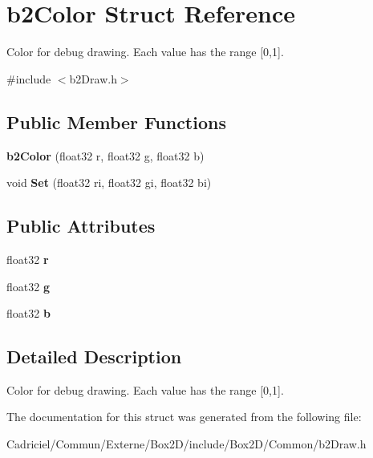 \hypertarget{structb2_color}{}\section{b2\+Color Struct Reference}
\label{structb2_color}


Color for debug drawing. Each value has the range \mbox{[}0,1\mbox{]}.  




{\ttfamily \#include $<$b2\+Draw.\+h$>$}

\subsection*{Public Member Functions}
\begin{DoxyCompactItemize}
\item 
{\bfseries b2\+Color} (float32 r, float32 g, float32 b)\hypertarget{structb2_color_abddfc60d402d691542a224921868bfb7}{}\label{structb2_color_abddfc60d402d691542a224921868bfb7}

\item 
void {\bfseries Set} (float32 ri, float32 gi, float32 bi)\hypertarget{structb2_color_af35a718911e10a54fa8aaa86367a5b56}{}\label{structb2_color_af35a718911e10a54fa8aaa86367a5b56}

\end{DoxyCompactItemize}
\subsection*{Public Attributes}
\begin{DoxyCompactItemize}
\item 
float32 {\bfseries r}\hypertarget{structb2_color_a9ab6c9a910caee177d96980b74ffb00b}{}\label{structb2_color_a9ab6c9a910caee177d96980b74ffb00b}

\item 
float32 {\bfseries g}\hypertarget{structb2_color_a241c742352403ec456b51ac5f2abe7d9}{}\label{structb2_color_a241c742352403ec456b51ac5f2abe7d9}

\item 
float32 {\bfseries b}\hypertarget{structb2_color_a9e7380d27a63010cfad49b97f66dcd26}{}\label{structb2_color_a9e7380d27a63010cfad49b97f66dcd26}

\end{DoxyCompactItemize}


\subsection{Detailed Description}
Color for debug drawing. Each value has the range \mbox{[}0,1\mbox{]}. 

The documentation for this struct was generated from the following file\+:\begin{DoxyCompactItemize}
\item 
Cadriciel/\+Commun/\+Externe/\+Box2\+D/include/\+Box2\+D/\+Common/b2\+Draw.\+h\end{DoxyCompactItemize}
